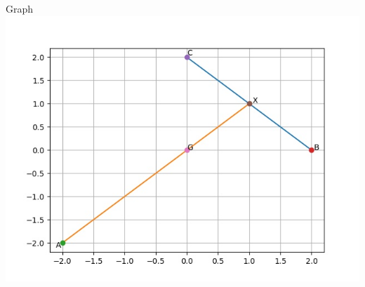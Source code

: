\documentclass{beamer}
\begin{document}
\begin{frame}{\LARGE Graph}
\includegraphics[scale=0.5]{figure1}
\end{frame}
\end{document}
